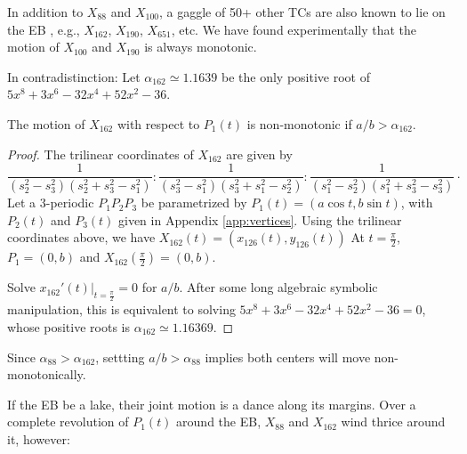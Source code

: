 %

In addition to $X_{88}$ and $X_{100}$, a gaggle of 50+ other TCs are also known to lie on the EB \cite[X(9)]{etc}, e.g., $X_{162}$, $X_{190}$, $X_{651}$, etc. We have found experimentally that the motion of $X_{100}$ and $X_{190}$ is always monotonic.

In contradistinction: Let $\alpha_{162}{\simeq}1.1639$ be the only positive root of $5 x^8 + 3 x^6 - 32 x^4 + 52 x^2 - 36$.

\begin{proposition}\label{prop:x162}
The motion of $X_{162}$ with respect to $P_1(t)$ is non-monotonic if $a/b>\alpha_{162}$. 
\end{proposition}

\begin{proof}
The trilinear coordinates of $X_{162}$ are given by
{\small 
\[  \frac {1}{ \left( s_2^{2}-  s_3^{2} \right)  \left( s_2^{2}+ s_3^{2}-
s_1^{2} \right) } :  \frac {1}{ \left( s_3^{2}-  s_1^{2} \right)  \left( s_3^{2}+ s_1^{2} -
s_2^{2} \right) }:\frac {1}{ \left( s_1^{2}-  s_2^{2} \right)  \left( s_1^{2}+ s_3^{2} -
s_3^{2}\right) }\cdot
\]
}
Let a 3-periodic $P_1P_2P_3$ be parametrized by $P_1(t)=(a\cos t, b\sin t)$, with $P_2(t)$ and $P_3(t)$
given in Appendix \ref{app:vertices}.
Using the trilinear coordinates above, we have   $X_{162}(t)=(x_{126}(t), y_{126}(t))$ 
  At $t=\frac{\pi}{2}$, $P_1=(0,b)$ and   $X_{162}(\frac{\pi}{2})= (0,b)$.
  
  Solve $x_{162}'(t)|_{t=\frac{\pi}{2}}=0$ for $a/b$. After some long algebraic symbolic manipulation, this is equivalent to solving $5 x^8 + 3 x^6 - 32 x^4 + 52 x^2 - 36=0$, whose positive roots is $  \alpha_{162} \simeq 1.16369.$
\end{proof}

Since $\alpha_{88}>\alpha_{162}$, settting $a/b>\alpha_{88}$ implies both centers will move non-monotonically.

If the EB be a lake, their joint motion is a dance along its margins.
Over a complete revolution of $P_1(t)$ around the EB, $X_{88}$ and $X_{162}$ wind thrice around it, however:

